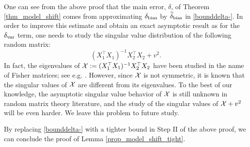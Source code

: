 One can see from the above proof that the main error, $\delta$, of Theorem \ref{thm_model_shift} comes from approximating $\delta_{\bias}$ by $\wt\delta_{\bias}$ in \eqref{bounddelta-}. In order to improve this estimate and obtain an exact asymptotic result as for the $\delta_{\vari}$ term, one needs to study the singular value distribution of the following random matrix:
$$(X_1^{\top}X_1)^{-1}X_2^{\top}X_2 +  {v}^2 .$$
In fact, the eigenvalues of $\cal X:=(X_1^{\top}X_1)^{-1}X_2^{\top}X_2$ have been studied in the name of Fisher matrices; see e.g. \cite{Fmatrix}. However, since $\cal X$ is not symmetric, it is known that the singular values of $\cal X$ are different from its eigenvalues. To the best of our knowledge, the asymptotic singular value behavior of $\cal X$ is still unknown in random matrix theory literature, and the study of the singular values of $\cal X + v^2$ will be even harder. We leave this problem to future study.


By replacing \eqref{bounddelta-} with a tighter bound in Step II of the above proof, we can conclude the proof of Lemma \ref{prop_model_shift_tight}.

